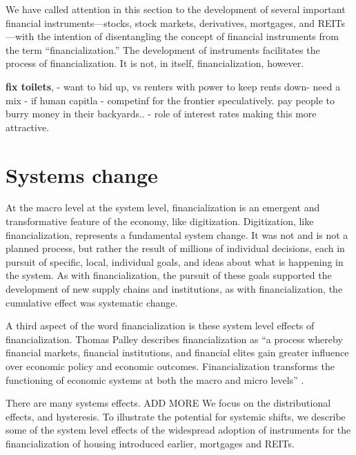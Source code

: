 We have called attention in this section to the development of several important financial instruments---stocks, stock markets, derivatives, mortgages, and REITs---with the intention of  disentangling the concept of financial instruments from the term ``financialization.'' The development of instruments facilitates the process of financialization. It is not, in itself, financialization, however.

\textbf{fix toilets}, - want to bid up, vs renters with power to keep rents down- need a mix - if hunan capitla - competinf for the frontier speculatively. pay people to burry money in their backyards.. - role of interest rates making this more attractive. 

\section{Systems change}
At the macro level at the system level, financialization is an emergent and transformative feature of the economy, like digitization. Digitization, like financialization, represents a fundamental  system  change. It was not and is not a planned process, but rather the result of millions of individual decisions, each in pursuit of specific, local, individual goals, and ideas about what is happening in the system.  As with financialization, the pursuit of these goals supported the development of new supply chains and institutions, as with  financialization, 
the cumulative effect was systematic change. 

A third aspect of the word financialization is these system level effects of financialization. Thomas Palley describes financialization as ``a process whereby financial markets, financial institutions, and financial elites gain greater influence over economic policy and economic outcomes. Financialization transforms the functioning of economic systems at both the macro and micro levels'' \cite{palleyFinancializationWhatIt2007}. 

There are many systems effects. ADD MORE %
We focus on the distributional effects, and hysteresis.
To illustrate the potential for systemic shifts, we describe some of the system level effects of the widespread adoption of instruments for the financialization of housing introduced earlier, mortgages and REITs. 

